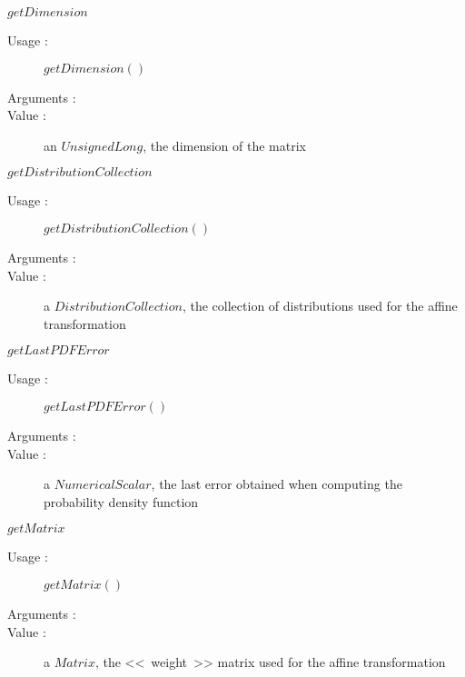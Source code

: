 \begin{description}
\begin{description}
  \item $getDimension$
    \begin{description}
    \item[Usage :]  $getDimension()$
    \item[Arguments :]  \strut
    \item[Value :] an $UnsignedLong$, the dimension of the matrix
    \end{description}

  \item $getDistributionCollection$
    \begin{description}
    \item[Usage :]  $getDistributionCollection()$
    \item[Arguments :]  \strut
    \item[Value :] a $DistributionCollection$, the collection of distributions used for the affine transformation
    \end{description}

  \item $getLastPDFError$
    \begin{description}
    \item[Usage :]  $getLastPDFError()$
    \item[Arguments :]  \strut
    \item[Value :] a $NumericalScalar$, the last error obtained when computing the probability density function
    \end{description}

  \item $getMatrix$
    \begin{description}
    \item[Usage :]  $getMatrix()$
    \item[Arguments :]  \strut
    \item[Value :] a $Matrix$, the <<~weight~>> matrix used for the affine transformation
    \end{description}


\end{description}
\end{description}
